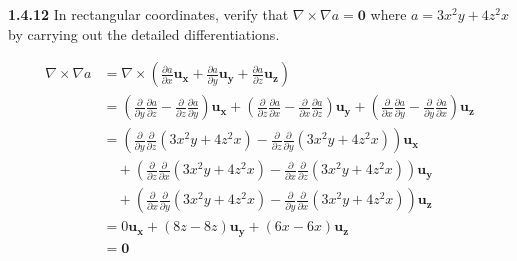 \documentclass{article}
\begin{document}
\textbf{1.4.12} In rectangular coordinates, verify that $\nabla \times \nabla a = \mathbf{0}$ where $a = 3x^2y + 4z^2x$
by carrying out the detailed differentiations.

\begin{equation*}
	\begin{split}
		\nabla \times \nabla a & = \nabla \times \left(
		\frac{\partial a}{\partial x} \mathbf{u_x}
		+ \frac{\partial a}{\partial y} \mathbf{u_y}
		+ \frac{\partial a}{\partial z} \mathbf{u_z}
		\right) \\
		& = \left(\frac{\partial}{\partial y} \frac{\partial a}{\partial z} - \frac{\partial}{\partial z} \frac{\partial a}{\partial y}\right)\mathbf{u_x}
		+ \left(\frac{\partial}{\partial z} \frac{\partial a}{\partial x} - \frac{\partial}{\partial x} \frac{\partial a}{\partial z}\right)\mathbf{u_y}
		+ \left(\frac{\partial}{\partial x} \frac{\partial a}{\partial y} - \frac{\partial}{\partial y} \frac{\partial a}{\partial x}\right)\mathbf{u_z} \\
		& = \left(\frac{\partial}{\partial y} \frac{\partial}{\partial z}(3x^2y + 4z^2x) - \frac{\partial}{\partial z} \frac{\partial}{\partial y}(3x^2y + 4z^2x)\right)\mathbf{u_x} \\
		& \quad + \left(\frac{\partial}{\partial z} \frac{\partial}{\partial x}(3x^2y + 4z^2x) - \frac{\partial}{\partial x} \frac{\partial}{\partial z}(3x^2y + 4z^2x)\right)\mathbf{u_y} \\
		& \quad + \left(\frac{\partial}{\partial x} \frac{\partial}{\partial y}(3x^2y + 4z^2x) - \frac{\partial}{\partial y} \frac{\partial}{\partial x}(3x^2y + 4z^2x)\right)\mathbf{u_z} \\
		& = 0\mathbf{u_x} + (8z-8z)\mathbf{u_y} + (6x-6x)\mathbf{u_z} \\
		& = \mathbf{0}
	\end{split}
\end{equation*}
\end{document}
